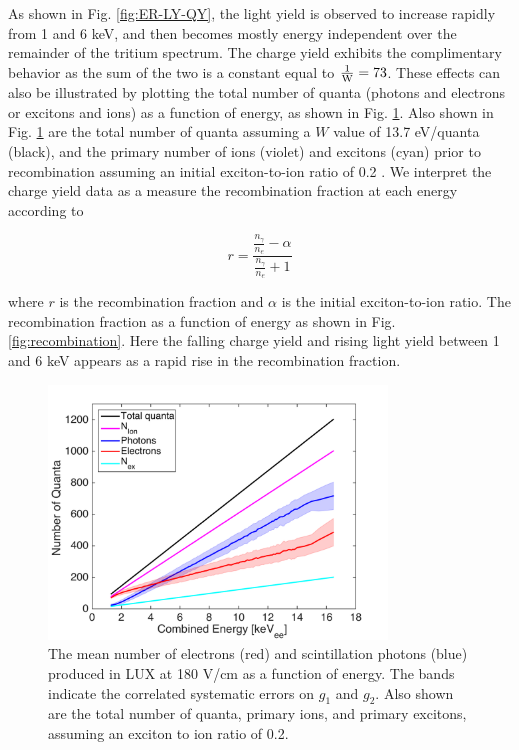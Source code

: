 As shown in Fig. \ref{fig:ER-LY-QY}, the light yield is observed to increase rapidly from 1 and 6 keV, and then becomes mostly energy independent over the remainder of the tritium spectrum. The charge yield exhibits the complimentary behavior as the sum of the two is a constant equal to $\rm \frac{1}{W}=73$. These effects can also be illustrated by plotting the total number of quanta (photons and electrons or excitons and ions) as a function of energy, as shown in Fig. \ref{fig:quanta-vs-energy}. Also shown in Fig. \ref{fig:quanta-vs-energy} are the total number of quanta assuming a $W$ value of 13.7 eV/quanta (black), and the primary number of ions (violet) and excitons (cyan) prior to recombination assuming an initial exciton-to-ion ratio of 0.2 \cite{alpha-value}. We interpret the charge yield data as a measure the recombination fraction at each energy according to

\begin{displaymath}
r = \frac{\frac{n_{\gamma}}{n_e} - \alpha}{\frac{n_{\gamma}}{n_e} + 1}
\end{displaymath}

\noindent
where $r$ is the recombination fraction and $\alpha$ is the initial exciton-to-ion ratio. The recombination fraction as a function of energy as shown in Fig. \ref{fig:recombination}. Here the falling charge yield and rising light yield between 1 and 6 keV appears as a rapid rise in the recombination fraction. 


\begin{figure}[h!]\centering
\includegraphics[width=90mm]{fig/quanta-vs-energy.png}
\caption{The mean number of electrons (red) and scintillation photons (blue) produced in LUX at 180 V/cm as a function of energy. The bands indicate the correlated systematic errors on $g_1$ and $g_2$. Also shown are the total number of quanta, primary ions, and primary excitons, assuming an exciton to ion ratio of 0.2. }
\label{fig:quanta-vs-energy}
\end{figure}



